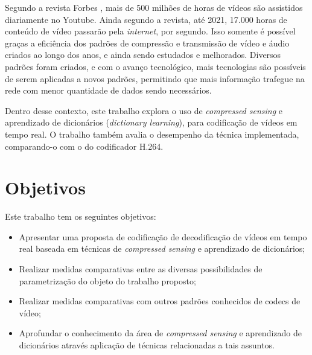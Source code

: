 \documentclass[cic,tc]{iiufrgs}
\begin{document}

Segundo a revista Forbes \cite{VideoMarketing}, mais de 500 milhões de horas de vídeos são assistidos 
diariamente no Youtube. 
Ainda segundo a revista, até 2021, 17.000 horas de conteúdo de vídeo passarão 
pela \emph{internet}, por segundo.
Isso somente é possível graças a eficiência 
dos padrões de compressão e transmissão de vídeo e áudio criados ao longo dos anos, 
e ainda sendo estudados e melhorados.
Diversos padrões foram criados, e com o avanço tecnológico, mais tecnologias
são possíveis de serem aplicadas a novos padrões, permitindo que mais informação
trafegue na rede com menor quantidade de dados sendo necessários.

Dentro desse contexto, este trabalho explora o uso de \emph{compressed sensing} e aprendizado de 
dicionários (\emph{dictionary learning}), para 
codificação de vídeos em tempo real.
O trabalho também avalia o desempenho da técnica implementada, comparando-o com o do codificador H.264. 

\section{Objetivos}
Este trabalho tem os seguintes objetivos:
\begin{itemize}
    \item Apresentar uma proposta de codificação de decodificação de vídeos
    em tempo real baseada em técnicas de \emph{compressed sensing} e aprendizado de 
    dicionários;
    \item Realizar medidas comparativas entre as diversas possibilidades 
    de parametrização do objeto do trabalho proposto;
    \item Realizar medidas comparativas com outros padrões conhecidos de 
    codecs de vídeo;
    \item Aprofundar o conhecimento da área de \emph{compressed sensing} e aprendizado 
    de dicionários através aplicação de técnicas relacionadas a tais assuntos.
\end{itemize}
\end{document}
